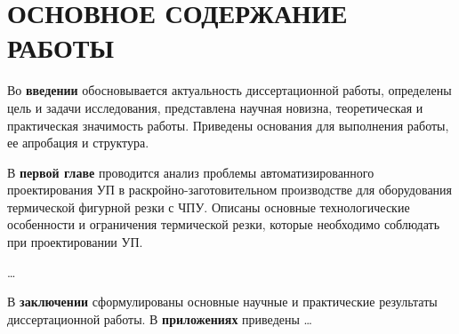 
\section*{ОСНОВНОЕ СОДЕРЖАНИЕ РАБОТЫ}
Во {\bf введении} 
обосновывается актуальность диссертационной работы, 
определены цель и задачи исследования, 
представлена научная новизна, теоретическая и практическая значимость работы. 
Приведены основания для выполнения работы, ее апробация и структура.

В {\bf первой главе} 
проводится анализ проблемы автоматизированного проектирования УП 
в раскройно-заготовительном производстве для оборудования термической фигурной резки с ЧПУ. 
Описаны основные технологические особенности и ограничения термической резки, 
которые необходимо соблюдать при проектировании УП.

\dots


В {\bf заключении} 
сформулированы основные научные и практические результаты
диссертационной работы.
В {\bf приложениях} 
приведены \dots

